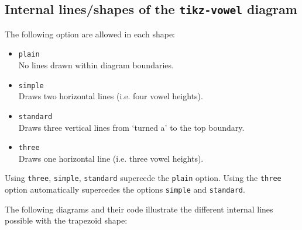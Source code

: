 \documentclass{article}
\newcommand{\pkg}[1]{\texttt{#1}}
\begin{document}
\subsection{Internal lines/shapes of the \pkg{tikz-vowel} diagram}
\label{sec:Internal lines/shapes of the tikz-vowel diagram}

The following option are allowed in each shape:

\begin{itemize}\itemsep0pt
	\item \texttt{plain} \\\qquad No lines drawn within diagram boundaries.
	\item \texttt{simple} \\\qquad Draws two horizontal lines (i.e. four vowel heights).
	\item \texttt{standard} \\\qquad Draws three vertical lines from `turned a' to the top boundary.
	\item \texttt{three} \\\qquad Draws one horizontal line (i.e. three vowel heights).
\end{itemize}

Using \texttt{three}, \texttt{simple}, \texttt{standard} supercede the \texttt{plain} option.  Using the \texttt{three} option automatically supercedes the options \texttt{simple} and \texttt{standard}.

\noindent
The following diagrams and their code illustrate the different internal lines possible with the trapezoid shape:
\end{document}
